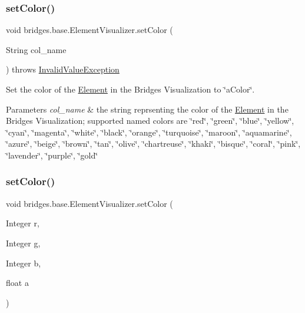 \subsubsection{\texorpdfstring{set\+Color()}{setColor()}\hspace{0.1cm}{\footnotesize\ttfamily [1/3]}}
{\footnotesize\ttfamily void bridges.\+base.\+Element\+Visualizer.\+set\+Color (\begin{DoxyParamCaption}\item[{String}]{col\+\_\+name }\end{DoxyParamCaption}) throws \hyperlink{classbridges_1_1validation_1_1_invalid_value_exception}{Invalid\+Value\+Exception}}

Set the color of the \hyperlink{classbridges_1_1base_1_1_element}{Element} in the Bridges Visualization to \char`\"{}a\+Color\char`\"{}.


\begin{DoxyParams}{Parameters}
{\em col\+\_\+name} & the string reprsenting the color of the \hyperlink{classbridges_1_1base_1_1_element}{Element} in the Bridges Visualization; supported named colors are \char`\"{}red\char`\"{}, \char`\"{}green\char`\"{}, \char`\"{}blue\char`\"{}, \char`\"{}yellow\char`\"{}, \char`\"{}cyan\char`\"{}, \char`\"{}magenta\char`\"{}, \char`\"{}white\char`\"{}, \char`\"{}black\char`\"{}, \char`\"{}orange\char`\"{}, \char`\"{}turquoise\char`\"{}, \char`\"{}maroon\char`\"{}, \char`\"{}aquamarine\char`\"{}, \char`\"{}azure\char`\"{}, \char`\"{}beige\char`\"{}, \char`\"{}brown\char`\"{}, \char`\"{}tan\char`\"{}, \char`\"{}olive\char`\"{}, \char`\"{}chartreuse\char`\"{}, \char`\"{}khaki\char`\"{}, \char`\"{}bisque\char`\"{}, \char`\"{}coral\char`\"{}, \char`\"{}pink\char`\"{}, \char`\"{}lavender\char`\"{}, \char`\"{}purple\char`\"{}, \char`\"{}gold\char`\"{} \\
\hline
\end{DoxyParams}
\hypertarget{classbridges_1_1base_1_1_element_visualizer_a84fad1c8abe43b20c68c1800d7630918}{}\label{classbridges_1_1base_1_1_element_visualizer_a84fad1c8abe43b20c68c1800d7630918} 
\subsubsection{\texorpdfstring{set\+Color()}{setColor()}\hspace{0.1cm}{\footnotesize\ttfamily [2/3]}}
{\footnotesize\ttfamily void bridges.\+base.\+Element\+Visualizer.\+set\+Color (\begin{DoxyParamCaption}\item[{Integer}]{r,  }\item[{Integer}]{g,  }\item[{Integer}]{b,  }\item[{float}]{a }\end{DoxyParamCaption})}

